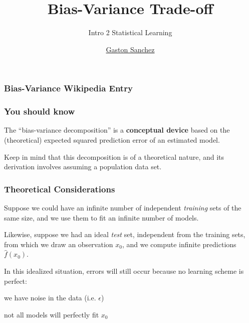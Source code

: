 \documentclass[12pt]{beamer}\usepackage[]{graphicx}\usepackage[]{color}
\title{Bias-Variance Trade-off}
\subtitle{Intro 2 Statistical Learning}
\author{\href{http://www.gastonsanchez.com}{Gaston Sanchez}}
\institute{\href{https://creativecommons.org/licenses/by-sa/4.0/}{\tt \scriptsize \color{foreground} CC BY-SA 4.0}}
\date{}
\begin{document}
{
  \frame{\titlepage} 
}


\begin{frame}
\begin{center}
\Huge{}
\end{center}
\end{frame}


\begin{frame}
\frametitle{Bias-Variance Wikipedia Entry}
\begin{center}
\end{center}
\end{frame}


\begin{frame}
\frametitle{You should know}

The ``bias-variance decomposition'' is a \textbf{conceptual device} based on
the (theoretical) expected squared prediction error of an estimated model.

\bigskip
Keep in mind that this decomposition is of a theoretical nature, and its
derivation involves assuming a population data set.

\end{frame}


\begin{frame}
\frametitle{Theoretical Considerations}

Suppose we could have an infinite number of independent \textit{training} sets of the same size,
and we use them to fit an infinite number of models.

\bigskip
Likewise, suppose we had an ideal \textit{test} set, independent from the training sets, 
from which we draw an observation $x_0$, and we compute infinite predictions $\hat{f}(x_0)$.

\bigskip
In this idealized situation, errors will still occur because no learning scheme is perfect:
\bi
  \item we have noise in the data (i.e. $\epsilon$)
  \item not all models will perfectly fit $x_0$
\ei

\end{frame}
\end{document}
